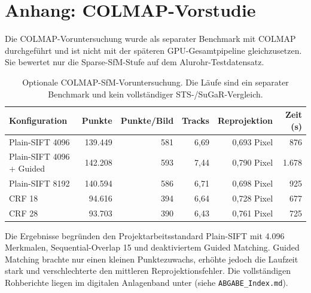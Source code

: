 \section{Anhang: COLMAP-Vorstudie}

Die COLMAP-Voruntersuchung wurde als separater Benchmark mit COLMAP
\parencite{colmapProject} durchgeführt und ist
nicht mit der späteren GPU-Gesamtpipeline gleichzusetzen. Sie bewertet nur die
Sparse-SfM-Stufe auf dem Alurohr-Testdatensatz.

\begin{table}[H]
\centering
\small
\begin{tabularx}{\textwidth}{Xrrrrr}
\toprule
Konfiguration & Punkte & Punkte/Bild & Tracks & Reprojektion & Zeit (s)\\
\midrule
Plain-SIFT 4096 & 139.449 & 581 & 6,69 & 0,693 Pixel & 876\\
Plain-SIFT 4096 + Guided & 142.208 & 593 & 7,44 & 0,790 Pixel & 1.678\\
Plain-SIFT 8192 & 140.594 & 586 & 6,71 & 0,698 Pixel & 925\\
CRF 18 & 94.616 & 394 & 6,64 & 0,728 Pixel & 677\\
CRF 28 & 93.703 & 390 & 6,43 & 0,761 Pixel & 725\\
\bottomrule
\end{tabularx}
\caption{Optionale COLMAP-SfM-Voruntersuchung. Die Läufe sind ein separater
Benchmark und kein vollständiger STS-/SuGaR-Vergleich.}
\label{tab:colmap-vorstudie}
\end{table}

Die Ergebnisse begründen den Projektarbeitsstandard Plain-SIFT mit 4.096
Merkmalen, Sequential-Overlap 15 und deaktiviertem Guided Matching. Guided
Matching brachte nur einen kleinen Punktezuwachs, erhöhte jedoch die Laufzeit
stark und verschlechterte den mittleren Reprojektionsfehler. Die vollständigen
Rohberichte liegen im digitalen Anlagenband unter 
(siehe \texttt{ABGABE\_Index.md}).
